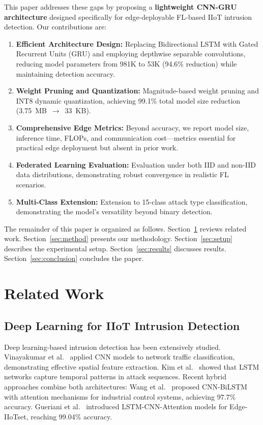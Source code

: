 \documentclass[10pt,journal]{IEEEtran}
\begin{document}
This paper addresses these gaps by proposing a \textbf{lightweight CNN-GRU architecture} designed specifically for edge-deployable FL-based IIoT intrusion detection. Our contributions are:
\begin{enumerate}
    \item \textbf{Efficient Architecture Design:} Replacing Bidirectional LSTM with Gated Recurrent Units (GRU) and employing depthwise separable convolutions, reducing model parameters from 981K to 53K (94.6\% reduction) while maintaining detection accuracy.
    \item \textbf{Weight Pruning and Quantization:} Magnitude-based weight pruning and INT8 dynamic quantization, achieving 99.1\% total model size reduction (3.75~MB~$\rightarrow$~33~KB).
    \item \textbf{Comprehensive Edge Metrics:} Beyond accuracy, we report model size, inference time, FLOPs, and communication cost---metrics essential for practical edge deployment but absent in prior work.
    \item \textbf{Federated Learning Evaluation:} Evaluation under both IID and non-IID data distributions, demonstrating robust convergence in realistic FL scenarios.
    \item \textbf{Multi-Class Extension:} Extension to 15-class attack type classification, demonstrating the model's versatility beyond binary detection.
\end{enumerate}

The remainder of this paper is organized as follows. Section~\ref{sec:related} reviews related work. Section~\ref{sec:method} presents our methodology. Section~\ref{sec:setup} describes the experimental setup. Section~\ref{sec:results} discusses results. Section~\ref{sec:conclusion} concludes the paper.

\section{Related Work}
\label{sec:related}

\subsection{Deep Learning for IIoT Intrusion Detection}

Deep learning-based intrusion detection has been extensively studied. Vinayakumar et al.~\cite{vinayakumar2017cnn} applied CNN models to network traffic classification, demonstrating effective spatial feature extraction. Kim et al.~\cite{kim2019deep} showed that LSTM networks capture temporal patterns in attack sequences. Recent hybrid approaches combine both architectures: Wang et al.~\cite{wang2024industrial} proposed CNN-BiLSTM with attention mechanisms for industrial control systems, achieving 97.7\% accuracy. Gueriani et al.~\cite{gueriani2025adaptive} introduced LSTM-CNN-Attention models for Edge-IIoTset, reaching 99.04\% accuracy.
\end{document}
